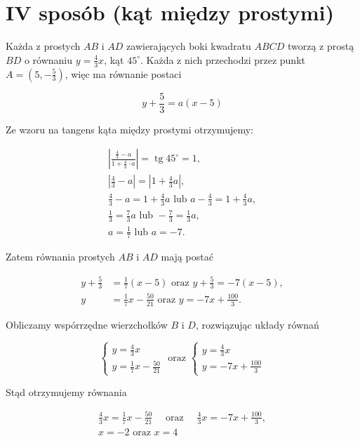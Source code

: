 \documentclass[10pt]{article}
\begin{document}
\section*{IV sposób (kąt między prostymi)}
Każda z prostych $A B$ i $A D$ zawierających boki kwadratu $A B C D$ tworzą z prostą $B D$ o równaniu $y=\frac{4}{3} x$, kąt $45^{\circ}$. Każda z nich przechodzi przez punkt $A=\left(5,-\frac{5}{3}\right)$, więc ma równanie postaci

$$
y+\frac{5}{3}=a(x-5)
$$

Ze wzoru na tangens kąta między prostymi otrzymujemy:

$$
\begin{gathered}
\left|\frac{\frac{4}{3}-a}{1+\frac{4}{3} \cdot a}\right|=\operatorname{tg} 45^{\circ}=1, \\
\left|\frac{4}{3}-a\right|=\left|1+\frac{4}{3} a\right|, \\
\frac{4}{3}-a=1+\frac{4}{3} a \text { lub } a-\frac{4}{3}=1+\frac{4}{3} a, \\
\frac{1}{3}=\frac{7}{3} a \text { lub }-\frac{7}{3}=\frac{1}{3} a, \\
a=\frac{1}{7} \text { lub } a=-7 .
\end{gathered}
$$

Zatem równania prostych $A B$ i $A D$ mają postać

$$
\begin{aligned}
y+\frac{5}{3} & =\frac{1}{7}(x-5) \text { oraz } y+\frac{5}{3}=-7(x-5), \\
y & =\frac{1}{7} x-\frac{50}{21} \text { oraz } y=-7 x+\frac{100}{3} .
\end{aligned}
$$

Obliczamy wspórrzędne wierzchołków $B$ i $D$, rozwiązując układy równań

$$
\left\{\begin{array} { l } 
{ y = \frac { 4 } { 3 } x } \\
{ y = \frac { 1 } { 7 } x - \frac { 5 0 } { 2 1 } }
\end{array} \text { oraz } \left\{\begin{array}{c}
y=\frac{4}{3} x \\
y=-7 x+\frac{100}{3}
\end{array}\right.\right.
$$

Stąd otrzymujemy równania

$$
\begin{gathered}
\frac{4}{3} x=\frac{1}{7} x-\frac{50}{21} \quad \text { oraz } \quad \frac{4}{3} x=-7 x+\frac{100}{3}, \\
x=-2 \text { oraz } x=4
\end{gathered}
$$
\end{document}
